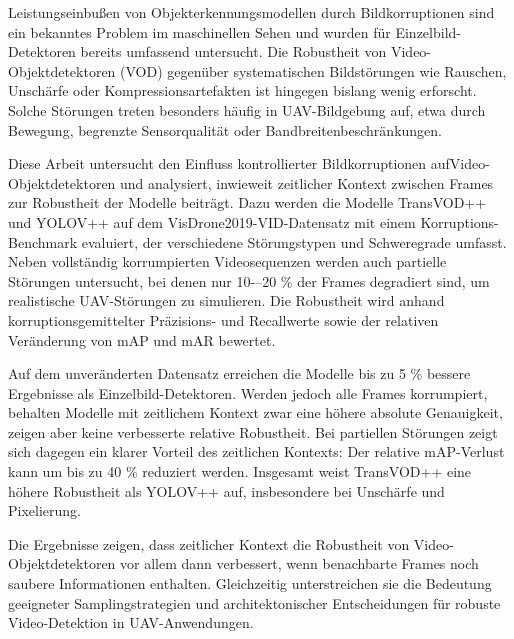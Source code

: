 \documentclass[final,twoside]{vutinfth}
\begin{document}
\begin{kurzfassung}
Leistungseinbußen von Objekterkennungsmodellen durch Bildkorruptionen sind ein bekanntes Problem im maschinellen Sehen und wurden für Einzelbild-Detektoren bereits umfassend untersucht.
Die Robustheit von Video-Objektdetektoren (VOD) gegenüber systematischen Bildstörungen wie Rauschen, Unschärfe oder Kompressionsartefakten ist hingegen bislang wenig erforscht.
Solche Störungen treten besonders häufig in UAV-Bildgebung auf, etwa durch Bewegung, begrenzte Sensorqualität oder Bandbreitenbeschränkungen.

Diese Arbeit untersucht den Einfluss kontrollierter Bildkorruptionen auf\newline Video-Objektdetektoren und analysiert, inwieweit zeitlicher Kontext zwischen Frames zur Robustheit der Modelle beiträgt.
Dazu werden die Modelle TransVOD++ und YOLOV++ auf dem VisDrone2019-VID-Datensatz mit einem Korruptions-Benchmark evaluiert, der verschiedene Störungstypen und Schweregrade umfasst.
Neben vollständig korrumpierten Videosequenzen werden auch partielle Störungen untersucht, bei denen nur 10-–20 \% der Frames degradiert sind, um realistische UAV-Störungen zu simulieren.
Die Robustheit wird anhand korruptionsgemittelter Präzisions- und Recallwerte sowie der relativen Veränderung von mAP und mAR bewertet.

Auf dem unveränderten Datensatz erreichen die Modelle bis zu 5 \% bessere Ergebnisse als Einzelbild-Detektoren.
Werden jedoch alle Frames korrumpiert, behalten Modelle mit zeitlichem Kontext zwar eine höhere absolute Genauigkeit, zeigen aber keine verbesserte relative Robustheit.
Bei partiellen Störungen zeigt sich dagegen ein klarer Vorteil des zeitlichen Kontexts: Der relative mAP-Verlust kann um bis zu 40 \% reduziert werden.
Insgesamt weist TransVOD++ eine höhere Robustheit als YOLOV++ auf, insbesondere bei Unschärfe und Pixelierung.

Die Ergebnisse zeigen, dass zeitlicher Kontext die Robustheit von Video-Objektdetektoren vor allem dann verbessert, wenn benachbarte Frames noch saubere Informationen enthalten.
Gleichzeitig unterstreichen sie die Bedeutung geeigneter Samplingstrategien und architektonischer Entscheidungen für robuste Video-Detektion in UAV-Anwendungen.
\end{kurzfassung}
\end{document}
